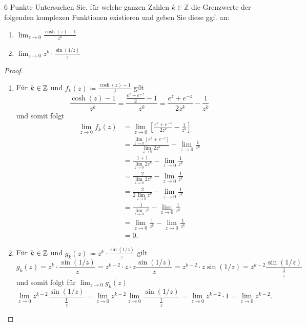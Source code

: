 \documentclass{../problemset}
\begin{document}
\begin{problem}[Grenzwerte]{6 Punkte}
Untersuchen Sie, für welche ganzen Zahlen $k \in \mathbb{Z}$ die Grenzwerte der folgenden komplexen Funktionen existieren und geben Sie diese ggf. an:

\begin{enumerate}
	\item $\lim_{z \to 0} \frac{\cosh(z) - 1}{z^k}$

	\item $\lim_{z \to 0} z^k \cdot \frac{\sin(1/z)}{z}$
\end{enumerate}

\begin{proof}
	\leavevmode
	\begin{enumerate}
		\item Für $k \in \mathbb{Z}$ und $f_k(z) \coloneqq \frac{\cosh(z) - 1}{z^k}$ gilt \[
			      \frac{\cosh(z) - 1}{z^k} = \frac{\frac{e^z + e^{-z}}{2} - 1}{z^k} = \frac{e^z + e^{-z}}{2z^k} - \frac{1}{z^k}
		      \] und somit folgt
		      \begin{align*}
			      \lim_{z \to 0} f_k(z) & = \lim_{z \to 0} \left[ \frac{e^z + e^{-z}}{2z^k} - \frac{1}{z^k} \right]                               \\
			                            & = \frac{\lim_{z \to 0} \left[ e^z + e^{-z} \right]}{\lim_{z \to 0} 2z^k} - \lim_{z \to 0} \frac{1}{z^k} \\
			                            & = \frac{1 + 1}{\lim_{z \to 0} 2z^k} - \lim_{z \to 0} \frac{1}{z^k}                                      \\
			                            & = \frac{2}{\lim_{z \to 0} 2z^k} - \lim_{z \to 0} \frac{1}{z^k}                                          \\
			                            & = \frac{2}{2 \lim_{z \to 0} z^k} - \lim_{z \to 0} \frac{1}{z^k}                                         \\
			                            & = \frac{1}{\lim_{z \to 0} z^k} - \lim_{z \to 0} \frac{1}{z^k}                                           \\
			                            & = \lim_{z \to 0} \frac{1}{z^k} - \lim_{z \to 0} \frac{1}{z^k}                                           \\
			                            & = 0.
		      \end{align*}

		\item Für $k \in \mathbb{Z}$ und $g_k(z) \coloneqq z^k \cdot \frac{\sin(1/z)}{z}$ gilt \[
			      g_k(z) = z^k \cdot \frac{\sin(1/z)}{z} = z^{k - 2} \cdot z \cdot z \frac{\sin(1/z)}{z} = z^{k - 2} \cdot z \sin(1/z) = z^{k - 2} \frac{\sin(1/z)}{\frac{1}{z}}
		      \] und somit folgt für $\lim_{ z \to 0} g_k(z)$ \[
			      \lim_{z \to 0} z^{k - 2} \frac{\sin(1/z)}{\frac{1}{z}} = \lim_{z \to 0} z^{k - 2} \lim_{z \to 0} \frac{\sin(1/z)}{\frac{1}{z}} = \lim_{z \to 0} z^{k - 2} \cdot 1 = \lim_{z \to 0} z^{k - 2}.
		      \]


\end{enumerate}
\end{proof}
\end{problem}
\end{document}
